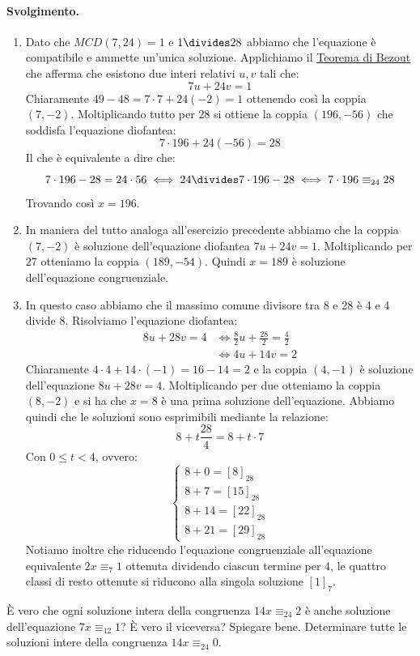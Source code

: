 \paragraph{Svolgimento.} \begin{enumerate}
	\item Dato che $MCD(7,24)=1$ e $1 \divides 28$ abbiamo che l'equazione è compatibile e ammette un'unica soluzione. Applichiamo il \hyperlink{thm:bezout}{Teorema di Bezout} che afferma che esistono due interi relativi $u,v$ tali che:
	\[7u+24v=1\]
	Chiaramente $49-48=7\cdot 7 + 24(-2)=1$ ottenendo così la coppia $(7,-2)$. Moltiplicando tutto per $28$ si ottiene la coppia $(196,-56)$ che soddisfa l'equazione diofantea:
	\[7 \cdot 196 + 24 (-56) = 28\]
	Il che è equivalente a dire che:
	\[7 \cdot 196 - 28 = 24 \cdot 56 \iff 24 \divides 7 \cdot 196-28 \iff 7 \cdot 196 \equiv_{24} 28 \]
	Trovando così $x=196$.
	\item In maniera del tutto analoga all'esercizio precedente abbiamo che la coppia $(7,-2)$ è soluzione dell'equazione diofantea $7u+24v=1$. Moltiplicando per 27 otteniamo la coppia $(189,-54)$. Quindi $x=189$ è soluzione dell'equazione congruenziale.
	\item In questo caso abbiamo che il massimo comune divisore tra 8 e 28 è 4 e 4 divide 8. Risolviamo l'equazione diofantea:
	\begin{align*}
		8u+28v=4 &\iff \frac{8}{2}u+\frac{28}{2}=\frac{4}{2} \\
		&\iff 4u+14v=2
	\end{align*}
	Chiaramente $4 \cdot 4 + 14 \cdot (-1) = 16-14=2$ e la coppia $(4,-1)$ è soluzione dell'equazione $8u+28v=4$. Moltiplicando per due otteniamo la coppia $(8,-2)$ e si ha che $x=8$ è una prima soluzione dell'equazione. Abbiamo quindi che le soluzioni sono esprimibili mediante la relazione:
	\[8+t\frac{28}{4}=8+t \cdot 7\]
	Con $0 \leq t < 4$, ovvero:
	\[
	\begin{cases}
		8+0 = [8]_{28}\\
		8+7 = [15]_{28}\\
		8+14=[22]_{28}\\
		8+21=[29]_{28}
	\end{cases}
	\]
	Notiamo inoltre che riducendo l'equazione congruenziale all'equazione equivalente $2x \equiv_{7} 1$ ottenuta dividendo ciascun termine per 4, le quattro classi di resto ottenute si riducono alla singola soluzione $[1]_{7}$. \hfill \blacksquare
\end{enumerate}
\begin{exsbox}
	È vero che ogni soluzione intera della congruenza $14x \equiv_{24} 2$ è anche soluzione dell'equazione $7x \equiv_{12} 1$? È vero il viceversa? Spiegare bene. Determinare tutte le soluzioni intere della congruenza $14x \equiv_{24} 0$.
\end{exsbox}
